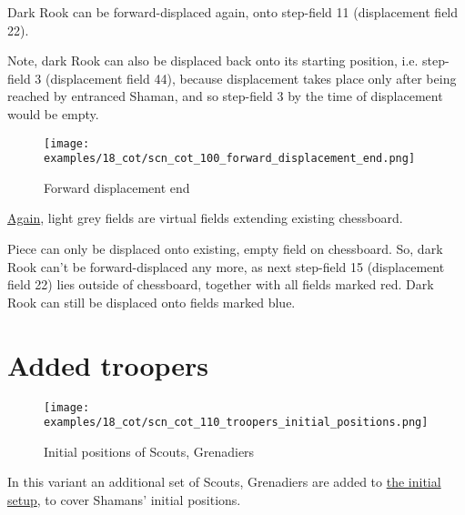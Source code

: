 Dark Rook can be forward-displaced again, onto step-field 11 (displacement field 22).

Note, dark Rook can also be displaced back onto its starting position, i.e. step-field
3 (displacement field 44), because displacement takes place only after being reached
by entranced Shaman, and so step-field 3 by the time of displacement would be empty.

\clearpage %

\noindent
\begin{figure}[!h]
\texttt{[image: examples/18\_cot/scn\_cot\_100\_forward\_displacement\_end.png]}
\caption{Forward displacement end}
\label{fig:scn_cot_100_forward_displacement_end}
\end{figure}

\hyperref[fig:scn_hd_06_centaur_off_board]{Again},
light grey fields are virtual fields extending existing chessboard.

Piece can only be displaced onto existing, empty field on chessboard. So, dark Rook
can't be forward-displaced any more, as next step-field 15 (displacement field 22)
lies outside of chessboard, together with all fields marked red. Dark Rook can still
be displaced onto fields marked blue.

\clearpage %

\section*{Added troopers}
\label{sec:Conquest of Tlalocan/Added troopers}

\vspace*{-1.2\baselineskip}
\noindent
\begin{figure}[!h]
\texttt{[image: examples/18\_cot/scn\_cot\_110\_troopers\_initial\_positions.png]}
\caption{Initial positions of Scouts, Grenadiers}
\label{fig:scn_cot_110_troopers_initial_positions}
\end{figure}

In this variant an additional set of Scouts, Grenadiers are added to
\hyperref[fig:18_conquest_of_tlalocan]{the initial setup},
to cover Shamans' initial positions.

